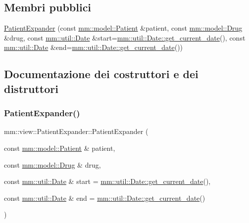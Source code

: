 \subsection*{Membri pubblici}
\begin{DoxyCompactItemize}
\item 
\mbox{\hyperlink{classmm_1_1view_1_1_patient_expander_a07daa447ceef9466613982c707d62eed}{Patient\+Expander}} (const \mbox{\hyperlink{classmm_1_1model_1_1_patient}{mm\+::model\+::\+Patient}} \&patient, const \mbox{\hyperlink{classmm_1_1model_1_1_drug}{mm\+::model\+::\+Drug}} \&drug, const \mbox{\hyperlink{structmm_1_1util_1_1_date}{mm\+::util\+::\+Date}} \&start=\mbox{\hyperlink{structmm_1_1util_1_1_date_af0758fad7ef32fd535db3295136466eb}{mm\+::util\+::\+Date\+::get\+\_\+current\+\_\+date}}(), const \mbox{\hyperlink{structmm_1_1util_1_1_date}{mm\+::util\+::\+Date}} \&end=\mbox{\hyperlink{structmm_1_1util_1_1_date_af0758fad7ef32fd535db3295136466eb}{mm\+::util\+::\+Date\+::get\+\_\+current\+\_\+date}}())
\end{DoxyCompactItemize}


\subsection{Documentazione dei costruttori e dei distruttori}
\mbox{\label{classmm_1_1view_1_1_patient_expander_a07daa447ceef9466613982c707d62eed}} 
\subsubsection{\texorpdfstring{Patient\+Expander()}{PatientExpander()}}
{\footnotesize\ttfamily mm\+::view\+::\+Patient\+Expander\+::\+Patient\+Expander (\begin{DoxyParamCaption}\item[{const \mbox{\hyperlink{classmm_1_1model_1_1_patient}{mm\+::model\+::\+Patient}} \&}]{patient,  }\item[{const \mbox{\hyperlink{classmm_1_1model_1_1_drug}{mm\+::model\+::\+Drug}} \&}]{drug,  }\item[{const \mbox{\hyperlink{structmm_1_1util_1_1_date}{mm\+::util\+::\+Date}} \&}]{start = {\ttfamily \mbox{\hyperlink{structmm_1_1util_1_1_date_af0758fad7ef32fd535db3295136466eb}{mm\+::util\+::\+Date\+::get\+\_\+current\+\_\+date}}()},  }\item[{const \mbox{\hyperlink{structmm_1_1util_1_1_date}{mm\+::util\+::\+Date}} \&}]{end = {\ttfamily \mbox{\hyperlink{structmm_1_1util_1_1_date_af0758fad7ef32fd535db3295136466eb}{mm\+::util\+::\+Date\+::get\+\_\+current\+\_\+date}}()} }\end{DoxyParamCaption})}



